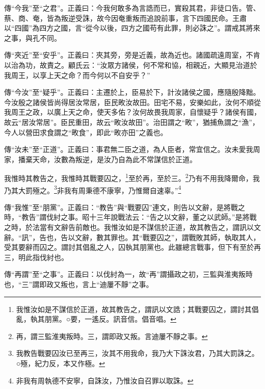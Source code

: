 {\noindent\zhuan{}\fzbyks 傳“今我”至“之君”。正義曰：今我何敢多為言誥而已，實殺其君，非徒口告。管、蔡、商、奄，皆為叛逆受誅，故今因奄重叛而追說前事，言下四國民命。王肅以“四國”為四方之國，言“從今以後，四方之國苟有此罪，則必誅之”。謂戒其將來之事，與孔不同。 \par}

{\noindent\zhuan{}\fzbyks 傳“夾近”至“安乎”。正義曰：夾其旁，旁是近義，故為近也。諸國疏遠周室，不肯以治為功，故責之。顧氏云：“汝眾方諸侯，何不常和協，相親近，大顯見治道於我周王，以享上天之命？而今何以不自安乎？” \par}

{\noindent\zhuan{}\fzbyks 傳“今汝”至“疑乎”。正義曰：主遷於上，臣易於下，計汝諸侯之國，應隨殷降黜。今汝殷之諸侯皆尚得居汝常居，臣民畋汝故田。田宅不易，安樂如此，汝何不順從我周王之政，以廣上天之命，使天多佑？汝何故畏我周家，自懷疑乎？諸侯有國，故云“居汝常居”。臣民重田，故云“畋汝故田”。治田謂之“畋”，猶捕魚謂之“漁”，今人以營田求食謂之“畋食”，即此“畋亦田”之義也。 \par}

{\noindent\zhuan{}\fzbyks 傳“汝未”至“正道”。正義曰：事君無二臣之道，為人臣者，常宜信之。汝未愛我周家，播棄天命，汝數為叛逆，是汝乃自為此不常謀信於正道。 \par}

我惟時其教告之，我惟時其戰要囚之，\footnote{我惟汝如是不謀信於正道，故其教告之，謂訊以文誥；其戰要囚之，謂討其倡亂，執其朋黨。○要，一遙反。訊音信。倡音唱。}至於再，至於三。\footnote{再，謂三監淮夷叛時。三，謂即政又叛。言迪屢不靜之事。}乃有不用我降爾命，我乃其大罰殛之。\footnote{我教告戰要囚汝已至再三，汝其不用我命，我乃大下誅汝君，乃其大罰誅之。○殛，紀力反，本又作極。}非我有周秉德不康寧，乃惟爾自速辜。”\footnote{非我有周執德不安寧，自誅汝，乃惟汝自召罪以取誅。}

{\noindent\zhuan{}\fzbyks 傳“我惟”至“朋黨”。正義曰：“教告”與“戰要囚”連文，則告以文辭，是將戰之時，“教告”謂伐紂之事。昭十三年說戰法云：“告之以文辭，董之以武師。”是將戰之時，於法當有文辭告前敵也。我惟汝如是不謀信於正道，故其教告之，謂訊以文辭。“訊”，告也，告以文辭，數其罪也。其“戰要囚之”，謂戰敗其師，執取其人，受其要辭而囚之。謂討其倡亂之人，囚執其朋黨也。此雖總言戰事，但下有至於再三，明此指伐紂也。 \par}

{\noindent\zhuan{}\fzbyks 傳“再謂”至“之事”。正義曰：以伐紂為一，故“再”謂攝政之初，三監與淮夷叛時也，“三”謂即政又叛也，言上“迪屢不靜”之事。 \par}

